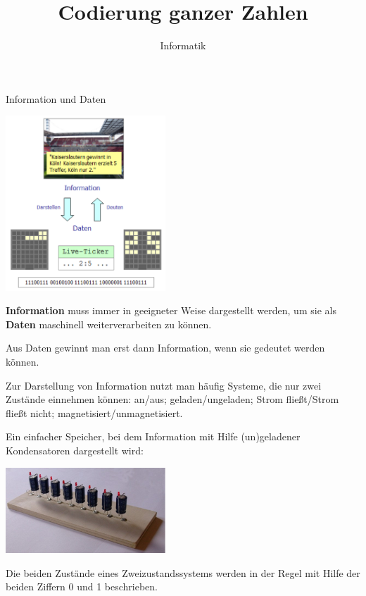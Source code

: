 \documentclass[10pt]{beamer}
\begin{document}
\title{Codierung ganzer Zahlen}   
\author{Informatik} 
\date{ } 

\frame{\titlepage} 

\begin{frame}[fragile]
Information und Daten

\begin{minipage}[c]{6.5cm}
\includegraphics[width=6cm]{bild1.png}
\end{minipage} 
\begin{minipage}[c]{5cm}
\textbf{Information} muss immer in geeigneter Weise dargestellt werden, um sie als \textbf{Daten} maschinell weiterverarbeiten zu können.

Aus Daten gewinnt man erst dann Information, wenn sie gedeutet werden können.
\end{minipage} 
\end{frame}

\begin{frame}[fragile]
Zur Darstellung von Information nutzt man häufig Systeme, die nur zwei Zustände einnehmen können: 
 an/aus; geladen/ungeladen; Strom fließt/Strom fließt nicht; magnetisiert/unmagnetisiert.
 
Ein einfacher Speicher, bei dem Information mit Hilfe (un)geladener Kondensatoren dargestellt wird:

\includegraphics[width=6cm]{bild2.png}

Die beiden Zustände eines Zweizustandssystems werden in der Regel mit Hilfe der beiden Ziffern 0 und 1 beschrieben.
\end{frame}
\end{document}
